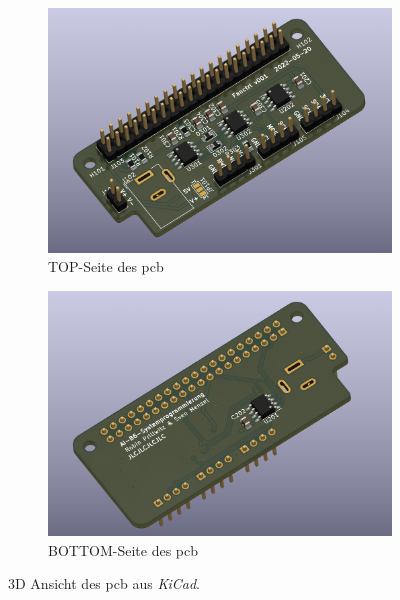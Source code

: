 \begin{figure}[H]
    \centering
    \begin{subfigure}{1.0\textwidth}
        \centering
        \includegraphics[width=15cm]{./img/pcb-3d-top.png}
        \caption{TOP-Seite des \gls{pcb}}
    \end{subfigure}
    \begin{subfigure}{1.0\textwidth}
        \centering
        \includegraphics[width=15cm]{./img/pcb-3d-bottom.png}
        \caption{BOTTOM-Seite des \gls{pcb}}
    \end{subfigure}
    \caption{3D Ansicht des \gls{pcb} aus \textit{KiCad}.}
    \label{fig:pcb-3d}
\end{figure}
\newpage


